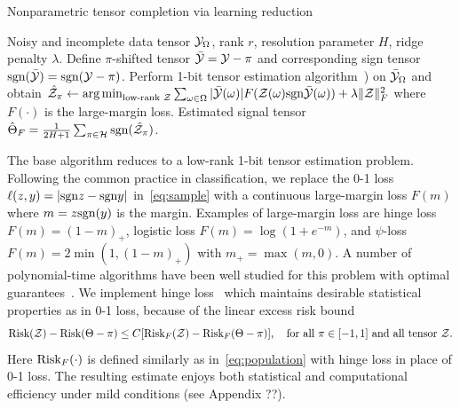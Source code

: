 \documentclass{article}
\theoremstyle{plain}
\theoremstyle{definition}
\def\sign{\textup{sgn}}
\def\risk{\textup{Risk}}
\begin{document}
\vspace{-.2cm}
\begin{algorithm}[h!]
  \caption{Nonparametric tensor completion via learning reduction}\label{alg:tensorT}
 \begin{algorithmic}[1] 
\INPUT Noisy and incomplete data tensor $\mathcal{Y}_\Omega$, rank $r$, resolution parameter $H$, ridge penalty $\lambda$.
\State Define $\pi$-shifted tensor $\bar {\mathcal{Y}}=\mathcal{Y}-\pi$ and corresponding sign tensor $\sign(\bar \tY)=\sign(\tY-\pi)$. 
\State Perform 1-bit tensor estimation algorithm~\citep{ghadermarzy2018learning,wang2018learning,hong2020generalized,alquier2019estimation}) on $\bar {\mathcal{Y}}_\Omega$ and obtain $\hat \tZ_\pi\leftarrow \argmin_{\text{low-rank }\tZ}\sum_{\omega\in \Omega} |\bar \tY(\omega)|F(\tZ(\omega)\sign\bar \tY(\omega))+\lambda\FnormSize{}{\tZ}^2$ where $F(\cdot)$ is the large-margin loss.
\EndFor
\OUTPUT Estimated signal tensor $\hat \Theta_F={1\over 2H+1}\sum_{\pi \in \tH}\sign(\hat \tZ_\pi)$.
\vspace{-.1cm}
\end{algorithmic}
\end{algorithm}
\vspace{-.2cm}

The base algorithm reduces to a low-rank 1-bit tensor estimation problem. Following the common practice in classification, we replace the 0-1 loss $\ell(z,y)=|\sign z - \sign y|$ in~\eqref{eq:sample} with a continuous large-margin loss $F(m)$ where $m=z\sign(y)$ is the margin. Examples of large-margin loss are hinge loss $F(m) = (1-m)_+$, logistic loss $F(m) =\log(1+e^{-m})$, and $\psi$-loss $F(m)=2\min(1,(1-m)_+)$ with $m_{+}=\max(m,0)$. A number of polynomial-time algorithms have been well studied for this problem with optimal guarantees~\citep{ghadermarzy2018learning,wang2018learning,hong2020generalized,alquier2019estimation}. We implement hinge loss~\cite{alquier2019estimation,genzel2020robust} which maintains desirable statistical properties as in 0-1 loss, because of the linear excess risk bound
\[
\risk(\tZ)-\risk(\Theta-\pi)\leq C[\risk_F(\tZ)-\risk_F(\Theta-\pi)],\quad \text{for all }\pi\in[-1,1] \text{ and all tensor }\tZ.
\]
Here $\risk_F(\cdot)$ is defined similarly as in~\eqref{eq:population} with hinge loss in place of 0-1 loss. The resulting estimate enjoys both statistical and computational efficiency under mild conditions (see Appendix {\color{red} ??}). 
\end{document}
